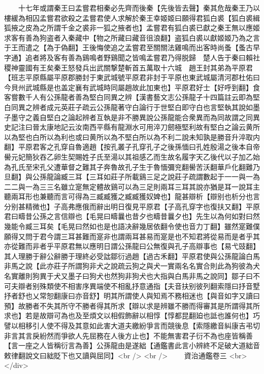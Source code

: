 　　十七年或謂秦王曰孟嘗君相秦必先齊而後秦【先後皆去聲】秦其危哉秦王乃以樓緩為相囚孟嘗君欲殺之孟嘗君使人求解於秦王幸姬姬曰願得君狐白裘【狐白裘緝狐掖之皮為之所謂千金之裘非一狐之掖者也】孟嘗君有狐白裘已獻之秦王無以應姬求客有善為狗盗者入秦藏中【物之所藏曰藏音徂浪翻】盗狐白裘以獻姬姬乃為之言于王而遣之【為于偽翻】王後悔使追之孟嘗君至關關法雞鳴而出客時尚蚤【蚤古早字通】追者將及客有善為鷄鳴者野鷄聞之皆鳴孟嘗君乃得脱歸　楚人告于秦曰賴社稷神靈國有王矣秦王怒發兵出武關撃楚斬首五萬取十六城　趙王封其弟為平原君【班志平原縣屬平原郡勝封于東武城號平原君非封于平原也東武城屬清河郡杜佑曰今貝州武城縣是也盖定襄有武城時同屬趙故此加東也】平原君好士【好呼到翻】食客嘗數千人有公孫龍者善為堅白同異之辨【漢書藝文志公孫龍子十四篇註云即為堅白同異之辨者成元英莊子疏云公孫龍著守白論行于世堅白即守白也言堅執其說如墨子墨守之義自堅白之論起辨者互執是非不勝異說公孫龍能合衆異而為同故謂之同異史記注曰晉太康地記云汝南西平縣有龍淵水可用淬刀劒極堅利故有堅白之論云黄所以為堅也白所以為利也或曰黄所以為不堅白所以為不利二說未知孰是勝音升淬取内翻】平原君客之孔穿自魯適趙【按孔叢子孔穿孔子之後孫愐曰孔姓殷湯之後本自帝嚳元妃簡狄吞乙卵生契賜姓子氏至湯以其祖感乙而生故名履字天乙後代以子加乙始為孔氏至宋孔父遭華督之難其子奔魯故孔子生于魯愐彌兖翻嚳苦沃翻華戶化翻難乃旦翻】與公孫龍論臧三耳【三耳如莊子所載鷄三足之說莊子疏謂數起于一一與一為二二與一為三三名雖立寔無定體故鷄可以為三足則兩耳三耳其說亦猶是耳一說耳主聽兩耳形也兼聽而言可得為三臧臧獲之臧臧獲奴婢也】龍甚辯析【辯别也析分也言分别甚精微也】子高弗應俄而辭出明日復見平原君【子高孔穿字也復扶又翻】平原君曰疇昔公孫之言信辯也【毛晃曰疇曩也昔夕也疇昔曩夕也】先生以為何如對曰然幾能令臧三耳矣【毛晃曰然如也是也語决辭幾居依翻令使也音力丁翻】雖然寔難僕願得又問于君今謂三耳甚難而寔非也謂兩耳甚易而寔是也不知君將從易而是者乎其亦從難而非者乎平原君無以應明日謂公孫龍曰公無復與孔子高辯事也【易弋豉翻】其人理勝于辭公辭勝于理終必受詘鄒衍過趙【過古禾翻】平原君使與公孫龍論白馬非馬之說【此亦莊子所謂狗非犬之說疏云狗之與犬一實兩名名實合則此為狗彼為犬名實離則狗異于犬又墨子曰狗犬也然狗非狗犬也大指與白馬非馬之說同】鄒子曰不可夫辯者别殊類使不相害序異端使不相亂抒意通指【夫音扶别彼列翻索隱曰抒音墅抒者舒也乂常恕翻康曰亦音舒】明其所謂使人與知焉不務相迷也【與音如字又讀曰預】故勝者不失其所守不勝者得其所求【辯以求是辨雖不勝而得審其是所謂得其所求也】若是故辯可為也及至煩文以相假飾辭以相惇【惇都昆翻廹也詆也誰何也】巧譬以相移引人使不得及其意如此害大道夫繳紛爭言而競後息【索隱繳音糾康吉弔切非言其言戾紛然而爭欲人先屈務在人後方止也】不能無害君子衍不為也座皆稱善【言一座之人皆稱衍言為善】公孫龍由是遂絀【通鑑書此言小辨終不足破大道絀音敕律翻說文曰絀貶下也又讀與屈同】<br />
<br />
　　資治通鑑卷三  <br>
   </div> 

